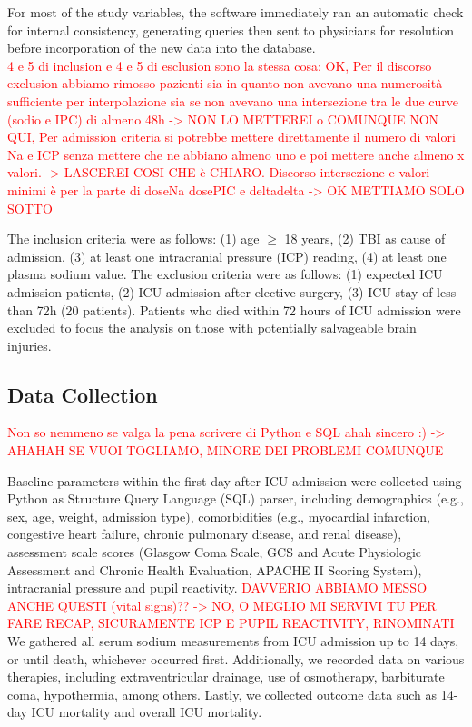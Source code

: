 For most of the study variables, the software immediately ran an automatic check for internal consistency, generating queries then sent to physicians for resolution before incorporation of the new data into the database.\\

\textcolor{red}{4 e 5 di inclusion e 4 e 5 di esclusion sono la stessa cosa: OK, Per il discorso exclusion abbiamo rimosso pazienti sia in quanto non avevano una numerosità sufficiente per interpolazione sia se non avevano una intersezione tra le due curve (sodio e IPC) di almeno 48h -> NON LO METTEREI o COMUNQUE NON QUI,  Per admission criteria si potrebbe mettere direttamente il numero di valori Na e ICP senza mettere che ne abbiano almeno uno e poi mettere anche almeno x valori. -> LASCEREI COSI CHE è CHIARO. Discorso intersezione e valori minimi è per la parte di doseNa dosePIC e deltadelta -> OK METTIAMO SOLO SOTTO}

The inclusion criteria were as follows: (1) age $\geq$ 18 years, (2) TBI as cause of admission, (3) at least one intracranial pressure (ICP) reading, (4) at least one plasma sodium value.
The exclusion criteria were as follows: (1) expected ICU admission patients, (2) ICU admission after elective surgery, (3) ICU stay of less than 72h (20 patients). Patients who died within 72 hours of ICU admission were excluded to focus the analysis on those with potentially salvageable brain injuries.

\subsection{Data Collection}
\textcolor{red}{Non so nemmeno se valga la pena scrivere di Python e SQL ahah sincero :) -> AHAHAH SE VUOI TOGLIAMO, MINORE DEI PROBLEMI COMUNQUE}

Baseline parameters within the first day after ICU admission were collected using Python as  Structure Query Language (SQL) parser, including demographics (e.g., sex, age, weight, admission type), comorbidities (e.g., myocardial infarction, congestive heart failure, chronic pulmonary disease, and renal disease), assessment scale scores (Glasgow Coma Scale, GCS and Acute Physiologic Assessment and Chronic Health Evaluation, APACHE II Scoring System), intracranial pressure and pupil reactivity. \textcolor{red}{DAVVERIO ABBIAMO MESSO ANCHE QUESTI (vital signs)?? -> NO, O MEGLIO MI SERVIVI TU PER FARE RECAP, SICURAMENTE ICP E PUPIL REACTIVITY, RINOMINATI} 
We gathered all serum sodium measurements from ICU admission up to 14 days, or until death, whichever occurred first. Additionally, we recorded data on various therapies, including extraventricular drainage, use of osmotherapy, barbiturate coma, hypothermia, among others. Lastly, we collected outcome data such as 14-day ICU mortality and overall ICU mortality.

